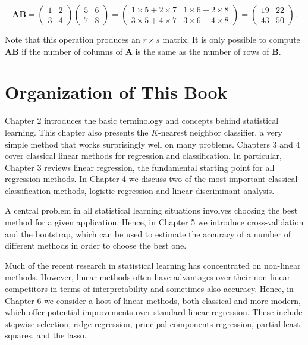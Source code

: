 \documentclass[10pt]{article}
\begin{document}
$$
\mathbf{A B}=\left(\begin{array}{ll}
1 & 2 \\
3 & 4
\end{array}\right)\left(\begin{array}{ll}
5 & 6 \\
7 & 8
\end{array}\right)=\left(\begin{array}{ll}
1 \times 5+2 \times 7 & 1 \times 6+2 \times 8 \\
3 \times 5+4 \times 7 & 3 \times 6+4 \times 8
\end{array}\right)=\left(\begin{array}{ll}
19 & 22 \\
43 & 50
\end{array}\right) .
$$

Note that this operation produces an $r \times s$ matrix. It is only possible to compute $\mathbf{A B}$ if the number of columns of $\mathbf{A}$ is the same as the number of rows of $\mathbf{B}$.

\section*{Organization of This Book}
Chapter 2 introduces the basic terminology and concepts behind statistical learning. This chapter also presents the $K$-nearest neighbor classifier, a very simple method that works surprisingly well on many problems. Chapters 3 and 4 cover classical linear methods for regression and classification. In particular, Chapter 3 reviews linear regression, the fundamental starting point for all regression methods. In Chapter 4 we discuss two of the most important classical classification methods, logistic regression and linear discriminant analysis.

A central problem in all statistical learning situations involves choosing the best method for a given application. Hence, in Chapter 5 we introduce cross-validation and the bootstrap, which can be used to estimate the accuracy of a number of different methods in order to choose the best one.

Much of the recent research in statistical learning has concentrated on non-linear methods. However, linear methods often have advantages over their non-linear competitors in terms of interpretability and sometimes also accuracy. Hence, in Chapter 6 we consider a host of linear methods, both classical and more modern, which offer potential improvements over standard linear regression. These include stepwise selection, ridge regression, principal components regression, partial least squares, and the lasso.
\end{document}

